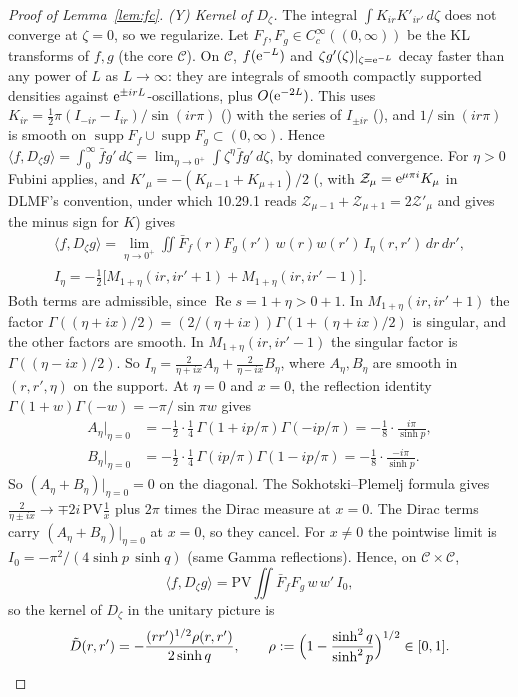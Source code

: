 \begin{proof}[Proof of Lemma~\ref{lem:fc}]
\medskip\noindent\emph{(Y) Kernel of $D_\zeta$.} The integral $\int K_{ir}K'_{ir'}\,d\zeta$ does not converge at $\zeta=0$, so we regularize.
Let $F_f,F_g\in C_c^\infty((0,\infty))$ be the KL transforms of $f,g$ (the core $\mathcal C$).
On $\mathcal C$, $f(\mathrm{e}^{-L})$ and $\zeta g'(\zeta)|_{\zeta=\mathrm{e}^{-L}}$ decay faster than any power of $L$ as $L\to\infty$: they are integrals of smooth compactly supported densities against $\mathrm{e}^{\pm ir L}$-oscillations, plus $O(\mathrm{e}^{-2L})$. This uses $K_{ir}=\tfrac12\pi(I_{-i r}-I_{i r})/\sin(i r\pi)$ (\cite[10.27.4]{DLMF}) with the series of $I_{\pm ir}$ (\cite[10.25.2]{DLMF}), and $1/\sin(i r\pi)$ is smooth on $\operatorname{supp}F_f\cup\operatorname{supp}F_g\subset(0,\infty)$.
Hence $\langle f,D_\zeta g\rangle=\int_0^\infty\bar f g'\,d\zeta=\lim_{\eta\to0^+}\int \zeta^\eta\bar fg'\,d\zeta$, by dominated convergence.
For $\eta>0$ Fubini applies, and $K'_\mu=-(K_{\mu-1}+K_{\mu+1})/2$ (\cite[10.29.1]{DLMF}, with $\mathcal Z_\mu=\mathrm{e}^{\mu\pi i}K_\mu$ in DLMF's convention, under which 10.29.1 reads $\mathcal Z_{\mu-1}+\mathcal Z_{\mu+1}=2\mathcal Z'_\mu$ and gives the minus sign for $K$) gives
\[
\begin{gathered}
\langle f,D_\zeta g\rangle=\lim_{\eta\to0^+}\iint\bar F_f(r)F_g(r')\,w(r)w(r')\,I_\eta(r,r')\,d r\,d r',\\
I_\eta=-\tfrac12\bigl[M_{1+\eta}(ir,ir'+1)+M_{1+\eta}(ir,ir'-1)\bigr].
\end{gathered}
\]
Both terms are admissible, since $\operatorname{Re}s=1+\eta>0+1$.
In $M_{1+\eta}(ir,ir'+1)$ the factor $\Gamma((\eta+ix)/2)=(2/(\eta+ix))\Gamma(1+(\eta+ix)/2)$ is singular, and the other factors are smooth. In $M_{1+\eta}(ir,ir'-1)$ the singular factor is $\Gamma((\eta-ix)/2)$.
So $I_\eta=\frac{2}{\eta+ix}A_\eta+\frac{2}{\eta-ix}B_\eta$, where $A_\eta,B_\eta$ are smooth in $(r,r',\eta)$ on the support.
At $\eta=0$ and $x=0$, the reflection identity $\Gamma(1+w)\Gamma(-w)=-\pi/\sin\pi w$ gives
\[
\begin{aligned}
A_\eta|_{\eta=0}&=-\tfrac12\cdot\tfrac14\,\Gamma(1+ip/\pi)\Gamma(-ip/\pi)=-\tfrac18\cdot\tfrac{i\pi}{\sinh p},\\
B_\eta|_{\eta=0}&=-\tfrac12\cdot\tfrac14\,\Gamma(ip/\pi)\Gamma(1-ip/\pi)=-\tfrac18\cdot\tfrac{-i\pi}{\sinh p}.
\end{aligned}
\]
So $(A_\eta+B_\eta)|_{\eta=0}=0$ on the diagonal.
The Sokhotski--Plemelj formula gives $\frac{2}{\eta\pm ix}\to\mp2i\,\mathrm{PV}\frac1x$ plus $2\pi$ times the Dirac measure at $x=0$. The Dirac terms carry $(A_\eta+B_\eta)|_{\eta=0}$ at $x=0$, so they cancel.
For $x\neq0$ the pointwise limit is $I_0=-\pi^2/(4\sinh p\,\sinh q)$ (same Gamma reflections). Hence, on $\mathcal C\times\mathcal C$,
\[
\langle f,D_\zeta g\rangle=\mathrm{PV}\iint\bar F_fF_g\,w\,w'\,I_0,
\]
so the kernel of $D_\zeta$ in the unitary picture is
\[
\tilde D(r,r')=-\frac{(rr')^{1/2}\rho(r,r')}{2\sinh q},\qquad
\rho:=\Bigl(1-\frac{\sinh^2q}{\sinh^2p}\Bigr)^{1/2}\in[0,1].
\]


\end{proof}
